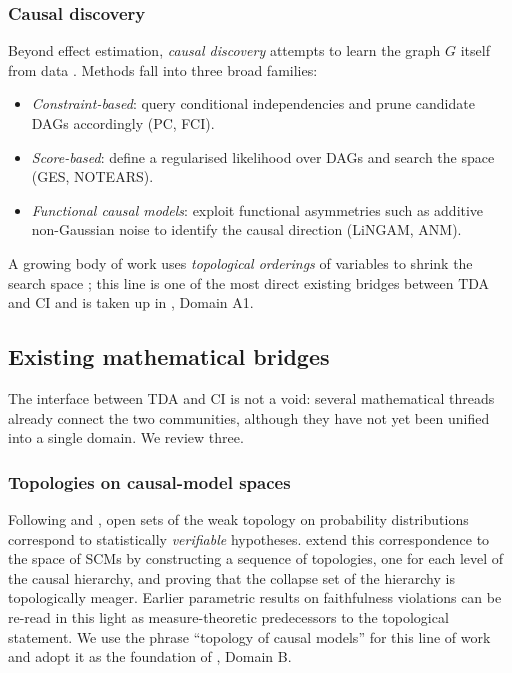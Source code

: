 \subsubsection{Causal discovery}

Beyond effect estimation, \emph{causal discovery} attempts to learn the
graph $G$ itself from data
\citep{spirtes2001causation,peters2014causal,
shimizu2006lingam,causaldisco2023survey}. Methods fall into three broad
families:
\begin{itemize}[leftmargin=*]
  \item \emph{Constraint-based}: query conditional independencies and
        prune candidate DAGs accordingly (PC, FCI).
  \item \emph{Score-based}: define a regularised likelihood over DAGs and
        search the space (GES, NOTEARS).
  \item \emph{Functional causal models}: exploit functional asymmetries
        such as additive non-Gaussian noise to identify the causal
        direction
        (LiNGAM, ANM).
\end{itemize}
A growing body of work uses \emph{topological orderings} of variables to
shrink the search space
\citep{xu2025information,tran2024constraining,wu2026optimization,
barroso2024inference}; this line is one of the most direct existing
bridges between TDA and CI and is taken up in ,
Domain A1.

\subsection{Existing mathematical bridges}
\label{sec:prelim_bridges}

The interface between TDA and CI is not a void: several mathematical
threads already connect the two communities, although they have not yet
been unified into a single domain. We review three.

\subsubsection{Topologies on causal-model spaces}

Following \citet{dembo1994topological} and \citet{genin2017topology},
open sets of the weak topology on probability distributions correspond to
statistically \emph{verifiable} hypotheses. \citet{ibeling2021topological}
extend this correspondence to the space of SCMs by constructing a sequence
of topologies, one for each level of the causal hierarchy, and proving
that the collapse set of the hierarchy is topologically meager. Earlier
parametric results on faithfulness violations
\citep{meek1995strong,uhler2013geometry} can be re-read in this light as
measure-theoretic predecessors to the topological statement. We use the
phrase ``topology of causal models'' for this line of work and adopt it
as the foundation of , Domain B.

